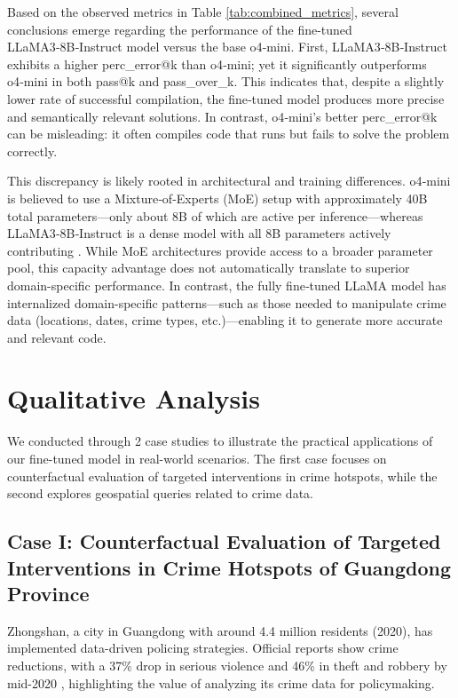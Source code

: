 Based on the observed metrics in Table \ref{tab:combined_metrics}, several conclusions emerge regarding the performance of the fine-tuned LLaMA3‑8B‑Instruct model versus the base o4‑mini. First, LLaMA3‑8B‑Instruct exhibits a higher perc\_error@k than o4‑mini; yet it significantly outperforms o4‑mini in both pass@k and pass\_over\_k. This indicates that, despite a slightly lower rate of successful compilation, the fine‑tuned model produces more precise and semantically relevant solutions. In contrast, o4‑mini's better perc\_error@k can be misleading: it often compiles code that runs but fails to solve the problem correctly.

This discrepancy is likely rooted in architectural and training differences. o4‑mini is believed to use a Mixture‑of‑Experts (MoE) setup with approximately 40B total parameters—only about 8B of which are active per inference—whereas LLaMA3‑8B‑Instruct is a dense model with all 8B parameters actively contributing . While MoE architectures provide access to a broader parameter pool, this capacity advantage does not automatically translate to superior domain-specific performance. In contrast, the fully fine‑tuned LLaMA model has internalized domain-specific patterns—such as those needed to manipulate crime data (locations, dates, crime types, etc.)—enabling it to generate more accurate and relevant code.

\section{Qualitative Analysis}

We conducted through 2 case studies to illustrate the practical applications of our fine-tuned model in real-world scenarios. The first case focuses on counterfactual evaluation of targeted interventions in crime hotspots, while the second explores geospatial queries related to crime data.

\subsection{Case I: Counterfactual Evaluation of Targeted Interventions in Crime Hotspots of Guangdong Province}

Zhongshan, a city in Guangdong with around 4.4 million residents (2020), has implemented data-driven policing strategies. Official reports show crime reductions, with a 37\% drop in serious violence and 46\% in theft and robbery by mid-2020 \cite{Zhongshan2020}, highlighting the value of analyzing its crime data for policymaking.

